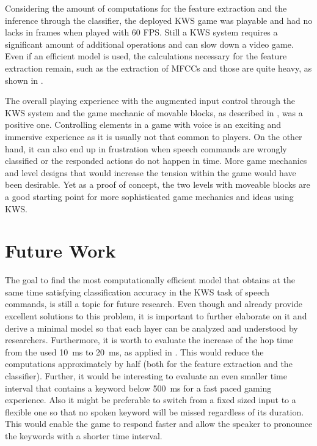 Considering the amount of computations for the feature extraction and the inference through the classifier, the deployed KWS game was playable and had no lacks in frames when played with 60 FPS.
Still a KWS system requires a significant amount of additional operations and can slow down a video game.
Even if an efficient model is used, the calculations necessary for the feature extraction remain, such as the extraction of MFCCs and those are quite heavy, as shown in .

The overall playing experience with the augmented input control through the KWS system and the game mechanic of movable blocks, as described in , was a positive one.
Controlling elements in a game with voice is an exciting and immersive experience as it is usually not that common to players.
On the other hand, it can also end up in frustration when speech commands are wrongly classified or the responded actions do not happen in time.
More game mechanics and level designs that would increase the tension within the game would have been desirable.
Yet as a proof of concept, the two levels with moveable blocks are a good starting point for more sophisticated game mechanics and ideas using KWS.



\section{Future Work}
The goal to find the most computationally efficient model that obtains at the same time satisfying classification accuracy in the KWS task of speech commands, is still a topic for future research.
Even though \cite{Zhang2017HelloEdge} and \cite{Peter2020ResourceEffDNN} already provide excellent solutions to this problem, it is important to further elaborate on it and derive a minimal model so that each layer can be analyzed and understood by researchers.
Furthermore, it is worth to evaluate the increase of the hop time from the used \SI{10}{\milli\second} to \SI{20}{\milli\second}, as applied in \cite{Peter2020ResourceEffDNN}.
This would reduce the computations approximately by half (both for the feature extraction and the classifier).
Further, it would be interesting to evaluate an even smaller time interval that contains a keyword below \SI{500}{\milli\second} for a fast paced gaming experience.
Also it might be preferable to switch from a fixed sized input to a flexible one so that no spoken keyword will be missed regardless of its duration.
This would enable the game to respond faster and allow the speaker to pronounce the keywords with a shorter time interval.

